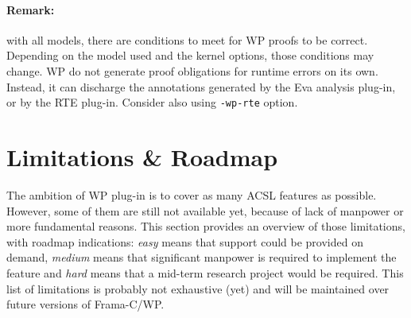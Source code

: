 \paragraph{Remark:} with all models, there are conditions to meet for WP
proofs to be correct. Depending on the model used and the kernel options, those conditions
may change. WP do not generate proof obligations for runtime errors on its own. Instead, it can
discharge the annotations generated by the \textsf{Eva} analysis plug-in, or by the \textsf{RTE} plug-in.
Consider also using \texttt{-wp-rte} option.

\section{Limitations \& Roadmap}

The ambition of \textsf{WP} plug-in is to cover as many \textsf{ACSL} features as possible. However, some of them are still not available yet, because of lack of manpower or more fundamental reasons. This section provides an overview of those limitations, with roadmap indications: \textit{easy}
means that support could be provided on demand, \textit{medium} means that
significant manpower is required to implement the feature and \textit{hard} means that a mid-term research project would be required. This list of limitations is probably not exhaustive (yet) and will be maintained over future versions of \textsf{Frama-C/WP}.

